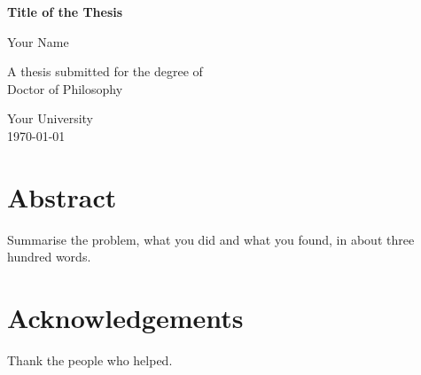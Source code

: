 \documentclass[11pt,a4paper,oneside]{report}
\begin{document}
\begin{titlepage}
  \centering
  \vspace*{3cm}
  {\Huge\bfseries Title of the Thesis\par}
  \vspace{1.5cm}
  {\Large Your Name\par}
  \vspace{1cm}
  {\large A thesis submitted for the degree of\\ Doctor of Philosophy\par}
  \vfill
  {\large Your University\\ \today\par}
\end{titlepage}

\chapter*{Abstract}
Summarise the problem, what you did and what you found, in about three hundred words.

\chapter*{Acknowledgements}
Thank the people who helped.

\tableofcontents

\cleardoublepage
{}




\appendix




\end{document}
